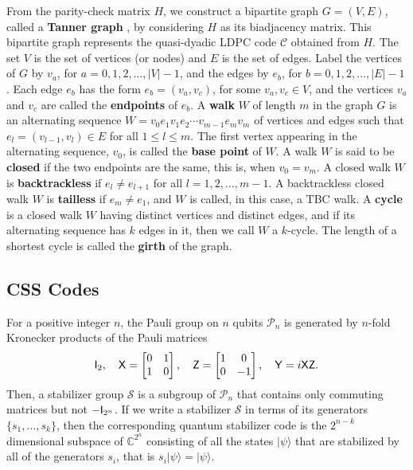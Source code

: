\documentclass[11pt]{article}
\theoremstyle{plain}
\theoremstyle{plain}
\theoremstyle{definition}
\numberwithin{theo}{section}
\newcommand{\C}{{\mathbb C}}
\newcommand{\cP}{{\mathcal P}}
\newcommand{\cS}{{\mathcal S}}
\newcounter{rom}
\newcommand{\sfX}{{\sf X}}
\newcommand{\sfZ}{{\sf Z}}
\begin{document}
From the parity-check matrix $H$, we construct a bipartite graph $G=(V,E)$, called a \textbf{Tanner graph} \cite{tan81}, by considering $H$ as its biadjacency matrix.
This bipartite graph represents the quasi-dyadic LDPC code $\mathcal{C}$ obtained from $H$. The set $V$ is the set of vertices (or nodes) and $E$ is the set of edges. Label the vertices of $G$ by $v_a$, for $a=0,1,2,\dots,|V|-1$, and the edges by $e_b$, for $b=0,1,2,\dots,|E|-1$. Each edge $e_b$ has the form $e_b=(v_a,v_c)$, for some $v_a,v_c\in V$, and the vertices $v_a$ and $v_c$ are called the \textbf{endpoints} of $e_b$. A %
\textbf{walk} $W$ of length $m$ in the graph $G$ is an alternating sequence $W=v_0e_1v_1e_2\cdots v_{m-1}e_mv_m$ of vertices and edges such that $e_l=(v_{l-1},v_l)\in E$ for all $1\leq l\leq m$. The first vertex appearing in the alternating sequence, $v_0$, is called the \textbf{base point} of $W$. A walk $W$ is said to be \textbf{closed} if the two endpoints are the same, this is, when $v_0=v_m$. A closed walk $W$ is \textbf{backtrackless} if $e_l\neq e_{l+1}$ for all $l=1,2,\dots,m-1$. A backtrackless closed walk $W$ is \textbf{tailless} if $e_m\neq e_1$, and $W$ is called, in this case, a TBC walk. A \textbf{cycle} is a closed walk $W$ having distinct vertices and distinct edges, and if its alternating sequence has $k$ edges in it, then we call $W$ a $k$-cycle. The length of a shortest cycle is called the \textbf{girth} of the graph.


\subsection{CSS Codes}
For a positive integer $n$, the Pauli group on $n$ qubits $\cP_n$ is generated by $n$-fold Kronecker products of the Pauli matrices
\begin{equation}\label{e-pauli}
    {\sf I}_2,\quad \sfX = \begin{bmatrix}0&1\\1&0\end{bmatrix} ,\quad \sfZ = \begin{bmatrix}1&0\\0&-1\end{bmatrix},\quad {\sf Y} = i\sfX\sfZ.
\end{equation}
Then, a stabilizer group $\cS$ is a subgroup of $\cP_n$ that contains only commuting matrices but not $-{\sf I}_{2^n}$.
If we write a stabilizer $\cS$ in terms of its generators $\{s_1,\ldots,s_k\}$, then the corresponding quantum stabilizer code is the $2^{n-k}$ dimensional subspace of $\C^{2^n}$ consisting of all the states $|\psi\rangle$ that are stabilized by all of the generators $s_i$, that is $s_i|\psi\rangle = |\psi\rangle$.
\end{document}
